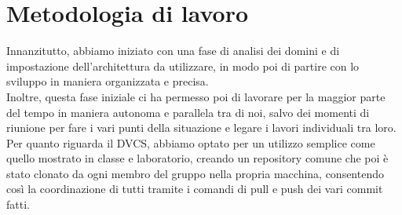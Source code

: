 \documentclass[a4paper,12pt]{report}
\begin{document}
\section{Metodologia di lavoro}

Innanzitutto, abbiamo iniziato con una fase di analisi dei domini e di impostazione dell'architettura da utilizzare, in modo poi di partire con lo sviluppo in maniera organizzata e precisa.
\\
Inoltre, questa fase iniziale ci ha permesso poi di lavorare per la maggior parte del tempo in maniera autonoma e parallela tra di noi, salvo dei momenti di riunione per fare i vari punti della situazione e legare i lavori individuali tra loro.
\\
Per quanto riguarda il DVCS, abbiamo optato per un utilizzo semplice come quello mostrato in classe e laboratorio, creando un repository comune che poi è stato clonato da ogni membro del gruppo nella propria macchina, consentendo così la coordinazione di tutti tramite i comandi di pull e push dei vari commit fatti.
\end{document}
